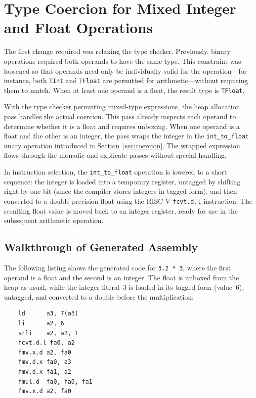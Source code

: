 \section{Type Coercion for Mixed Integer and Float Operations}\label{sec:type-coercion}

The first change required was relaxing the type checker. Previously, binary operations required both operands to have the same type. This constraint was loosened so that operands need only be individually valid for the operation---for instance, both \texttt{TInt} and \texttt{TFloat} are permitted for arithmetic---without requiring them to match. When at least one operand is a float, the result type is \texttt{TFloat}.

With the type checker permitting mixed-type expressions, the heap allocation pass handles the actual coercion. This pass already inspects each operand to determine whether it is a float and requires unboxing. When one operand is a float and the other is an integer, the pass wraps the integer in the \texttt{int\_to\_float} unary operation introduced in Section~\ref{sec:coercion}. The wrapped expression flows through the monadic and explicate passes without special handling.

In instruction selection, the \texttt{int\_to\_float} operation is lowered to a short sequence: the integer is loaded into a temporary register, untagged by shifting right by one bit (since the compiler stores integers in tagged form), and then converted to a double-precision float using the RISC-V \texttt{fcvt.d.l} instruction. The resulting float value is moved back to an integer register, ready for use in the subsequent arithmetic operation.

\subsection{Walkthrough of Generated Assembly}

The following listing shows the generated code for \texttt{3.2 * 3}, where the first operand is a float and the second is an integer. The float is unboxed from the heap as usual, while the integer literal~3 is loaded in its tagged form (value~6), untagged, and converted to a double before the multiplication:

\begin{lstlisting}
    ld      a3, 7(a3)
    li      a2, 6
    srli    a2, a2, 1
    fcvt.d.l fa0, a2
    fmv.x.d a2, fa0
    fmv.d.x fa0, a3
    fmv.d.x fa1, a2
    fmul.d  fa0, fa0, fa1
    fmv.x.d a2, fa0
\end{lstlisting}

